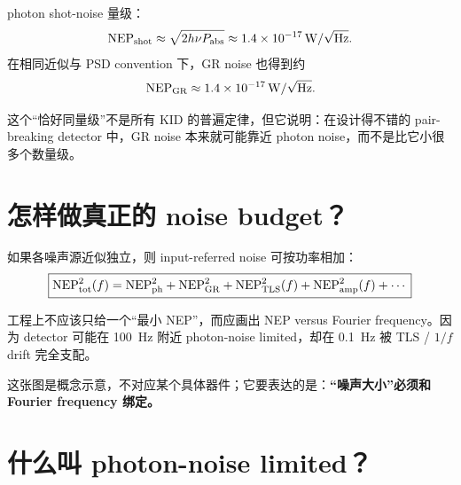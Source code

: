 \documentclass[11pt,a4paper,openany]{ctexrep}
\begin{document}
photon shot-noise 量级：
\[
\mathrm{NEP}_{\rm shot}
\approx
\sqrt{2h\nu P_{\rm abs}}
\approx
1.4\times10^{-17}\,\mathrm{W}/\sqrt{\mathrm{Hz}}.
\]
在相同近似与 PSD convention 下，GR noise 也得到约
\[
\mathrm{NEP}_{\rm GR}
\approx
1.4\times10^{-17}\,\mathrm{W}/\sqrt{\mathrm{Hz}}.
\]

这个“恰好同量级”不是所有 KID 的普遍定律，但它说明：在设计得不错的 pair-breaking detector 中，GR noise 本来就可能靠近 photon noise，而不是比它小很多个数量级。

\section{怎样做真正的 noise budget？}

如果各噪声源近似独立，则 input-referred noise 可按功率相加：
\[
\boxed{
\mathrm{NEP}_{\rm tot}^2(f)
=
\mathrm{NEP}_{\rm ph}^2
+
\mathrm{NEP}_{\rm GR}^2
+
\mathrm{NEP}_{\rm TLS}^2(f)
+
\mathrm{NEP}_{\rm amp}^2(f)
+\cdots
}
\]

工程上不应该只给一个“最小 NEP”，而应画出 NEP versus Fourier frequency。因为 detector 可能在 \SI{100}{Hz} 附近 photon-noise limited，却在 \SI{0.1}{Hz} 被 TLS / $1/f$ drift 完全支配。

\begin{center}
\end{center}

这张图是概念示意，不对应某个具体器件；它要表达的是：\textbf{“噪声大小”必须和 Fourier frequency 绑定。}

\section{什么叫 photon-noise limited？}
\end{document}
